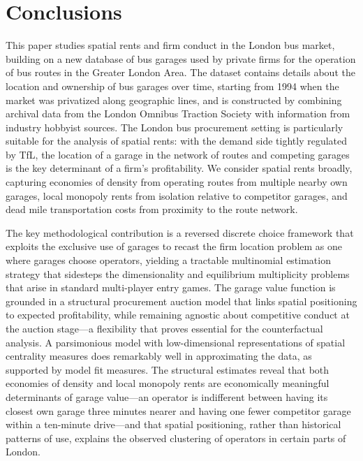 \documentclass[12pt]{article}
\newcommand{\rootdir}{..}  %
\newcommand{\tables}{\rootdir/\rootdir/Output/tables}
\newcommand\fnote[1]{\captionsetup{font=small}\caption*{\emph{Notes}: #1}} %
\begin{document}
\begin{table}[!tb]
\caption{Decomposition of welfare effects from Garage Reallocation}\label{tab:welfare-realloc}
\centering
\resizebox{0.8\textwidth}{!}{%
}
\fnote{Given the linearity of the structural model, we can compute for each covariate $k$ its change from baseline ($x_{kj}^0$) to optimal value as $\Delta x_{kj} = x_{kj}^* - x_{kj}^0$. The total change in welfare due to covariate $k$ is then $-\hat{\theta}_k \sum_j \Delta x_{kj}$, which is what the upper panel of the table shows.}
\end{table}

\section{Conclusions}\label{S:Conclusion}
This paper studies spatial rents and firm conduct in the London bus market, 
building on a new database of bus garages used by private firms for the 
operation of bus routes in the Greater London Area. The dataset contains 
details about the location and ownership of bus garages over time, starting 
from 1994 when the market was privatized along geographic lines, and is 
constructed by combining archival data from the London Omnibus Traction 
Society with information from industry hobbyist sources. The London bus 
procurement setting is particularly suitable for the analysis of spatial 
rents: with the demand side tightly regulated by TfL, the location of a 
garage in the network of routes and competing garages is the key determinant 
of a firm's profitability. We consider spatial rents broadly, capturing 
economies of density from operating routes from multiple nearby own garages, 
local monopoly rents from isolation relative to competitor garages, and dead 
mile transportation costs from proximity to the route network.

The key methodological contribution is a reversed discrete choice framework 
that exploits the exclusive use of garages to recast the firm location 
problem as one where garages choose operators, yielding a tractable 
multinomial estimation strategy that sidesteps the dimensionality and 
equilibrium multiplicity problems that arise in standard multi-player entry 
games. The garage value function is grounded in a structural procurement 
auction model that links spatial positioning to expected profitability, 
while remaining agnostic about competitive conduct at the auction 
stage---a flexibility that proves essential for the counterfactual analysis. 
A parsimonious model with low-dimensional representations of spatial 
centrality measures does remarkably well in approximating the data, as supported by model fit measures. The structural estimates 
reveal that both economies of density and local monopoly rents are 
economically meaningful determinants of garage value---an operator is 
indifferent between having its closest own garage three minutes nearer and 
having one fewer competitor garage within a ten-minute drive---and that 
spatial positioning, rather than historical patterns of use, explains the 
observed clustering of operators in certain parts of London.
\end{document}
